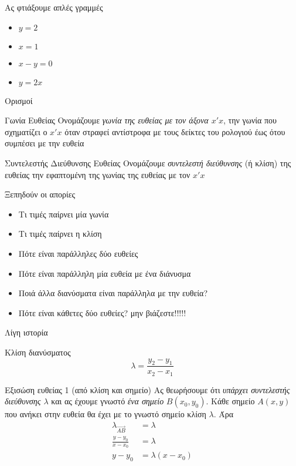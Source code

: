 \documentclass{../../presentation}
\begin{document}
\begin{frame}{Ας φτιάξουμε απλές γραμμές}
  \begin{itemize}[<+->]
    \item $y=2$
    \item $x=1$
    \item $x-y=0$
    \item $y=2x$
  \end{itemize}
\end{frame}

\begin{frame}{Ορισμοί}
  \begin{block}{Γωνία Ευθείας}
    Ονομάζουμε \emph{γωνία της ευθείας με τον άξονα $x'x$}, την γωνία που σχηματίζει ο $x'x$ όταν στραφεί αντίστροφα με τους δείκτες του ρολογιού έως ότου συμπέσει με την ευθεία
  \end{block}
  \begin{block}{Συντελεστής Διεύθυνσης Ευθείας}
    Ονομάζουμε \emph{συντελεστή διεύθυνσης} (ή κλίση) της ευθείας την εφαπτομένη της γωνίας της ευθείας με τον $x'x$
  \end{block}
\end{frame}

\begin{frame}{Ξεπηδούν οι απορίες}
  \begin{itemize}[<+->]
    \item Τι τιμές παίρνει μία γωνία
    \item Τι τιμές παίρνει η κλίση
    \item Πότε είναι παράλληλες δύο ευθείες
    \item Πότε είναι παράλληλη μία ευθεία με ένα διάνυσμα
    \item Ποιά άλλα διανύσματα είναι παράλληλα με την ευθεία?
    \item Πότε είναι κάθετες δύο ευθείες? μην βιάζεστε!!!!!
  \end{itemize}
\end{frame}

\begin{frame}{Λίγη ιστορία}
  \begin{block}{Κλίση διανύσματος}
    $$λ=\frac{y_2-y_1}{x_2-x_1}$$
  \end{block}
\end{frame}

\begin{frame}{Εξισώση ευθείας 1 (από κλίση και σημείο)}
  Ας θεωρήσουμε ότι \emph{υπάρχει συντελεστής διεύθυνσης $λ$} και ας έχουμε γνωστό \emph{ένα σημείο} $B(x_0,y_0)$. Κάθε σημείο $A(x,y)$ που ανήκει στην ευθεία θα έχει με το γνωστό σημείο κλίση $λ$. Άρα
  \begin{align*}
    λ_{\overrightarrow{AB}} & =λ        \\
    \frac{y-y_0}{x-x_0}     & =λ        \\
    y-y_0                   & =λ(x-x_0)
  \end{align*}
\end{frame}
\end{document}
